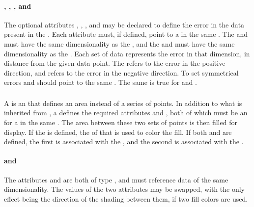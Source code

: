 \begin{blockChanged}
\paragraph*{, , , and }
The optional attributes , , , and  may be declared to define the error in the data present in the \Curve.  Each attribute must, if defined, point to a \DataGenerator in the same \SedDocument.  The  and  must have the same dimensionality as the , and the  and  must have the same dimensionality as the .  Each set of data represents the error in that dimension, in distance from the given data point.  The  refers to the error in the positive direction, and  refers to the error in the negative direction. To set symmetrical errors  and  should point to the same \DataGenerator.  The same is true for  and .


\subsubsection{}
\label{class:shadedArea}
A \ShadedArea is an \AbstractCurve that defines an area instead of a series of points.  In addition to what is inherited from \AbstractCurve, a \ShadedArea defines the required attributes  and , both of which must be an \SIdRef for a \DataGenerator in the same \SedDocument.  The area between these two sets of points is then filled for display.  If the  is defined, the \Fill of that \Style is used to color the fill.  If both  and  are defined, the first is associated with the , and the second is associated with the .

\paragraph*{ and }
The attributes  and  are both of type \SIdRef, and must reference data of the same dimensionality.  The values of the two attributes may be swapped, with the only effect being the direction of the shading between them, if two fill colors are used.

\end{blockChanged}



